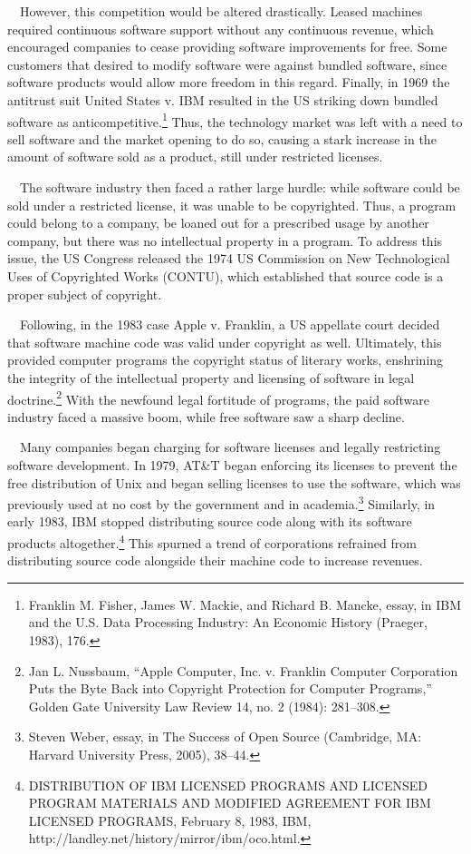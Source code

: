 \documentclass{article}
\begin{document}
\ \ However, this competition would be altered drastically. Leased machines required continuous software support without
any continuous revenue, which encouraged companies to cease providing software improvements for free. Some customers
that desired to modify software were against bundled software, since software products would allow more freedom in this
regard. Finally, in 1969 the antitrust suit United States v. IBM resulted in the US striking down bundled software as
anticompetitive.\footnote{Franklin M. Fisher, James W. Mackie, and Richard B. Mancke, essay, in IBM and the U.S. Data
Processing Industry: An Economic History (Praeger, 1983), 176.} Thus, the technology market was left with a need to
sell software and the market opening to do so, causing a stark increase in the amount of software sold as a product,
still under restricted licenses.

\ \ The software industry then faced a rather large hurdle: while software could be sold under a restricted license, it
was unable to be copyrighted. Thus, a program could belong to a company, be loaned out for a prescribed usage by
another company, but there was no intellectual property in a program. To address this issue, the US Congress released
the 1974 US Commission on New Technological Uses of Copyrighted Works (CONTU), which established that source code is a
proper subject of copyright. 

\ \ Following, in the 1983 case Apple v. Franklin, a US appellate court decided that software machine code was valid
under copyright as well. Ultimately, this provided computer programs the copyright status of literary works, enshrining
the integrity of the intellectual property and licensing of software in legal doctrine.\footnote{Jan L. Nussbaum,
“Apple Computer, Inc. v. Franklin Computer Corporation Puts the Byte Back into Copyright Protection for Computer
Programs,” Golden Gate University Law Review 14, no. 2 (1984): 281–308.} With the newfound legal fortitude of programs,
the paid software industry faced a massive boom, while free software saw a sharp decline.

\ \ Many companies began charging for software licenses and legally restricting software development. In 1979, AT\&T
began enforcing its licenses to prevent the free distribution of Unix and began selling licenses to use the software,
which was previously used at no cost by the government and in academia.\footnote{Steven Weber, essay, in The Success of
Open Source (Cambridge, MA: Harvard University Press, 2005), 38–44.} Similarly, in early 1983, IBM stopped distributing
source code along with its software products altogether.\footnote{DISTRIBUTION OF IBM LICENSED PROGRAMS AND LICENSED
PROGRAM MATERIALS AND MODIFIED AGREEMENT FOR IBM LICENSED PROGRAMS, February 8, 1983, IBM,
http://landley.net/history/mirror/ibm/oco.html.} This spurned a trend of corporations refrained from distributing
source code alongside their machine code to increase revenues.
\end{document}
